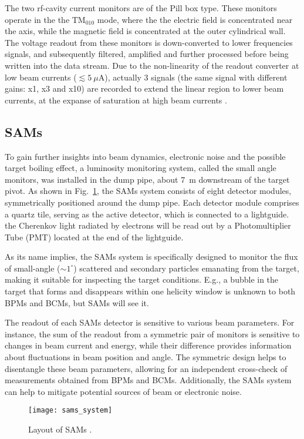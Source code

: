 The two rf-cavity current monitors are of the Pill box type. These monitors
operate in the the $\text{TM}_\text{010}$ mode, where the the electric field is
concentrated near the axis, while the magnetic field is concentrated at the outer
cylindrical wall. The voltage readout from these monitors is down-converted to 
lower frequencies signals, and subsequently filtered, amplified and further 
processed before being written into the data stream. Due to
the non-linearity of the readout converter at low beam currents ($\lesssim 5\ \mu$A), 
actually 3 signals (the same signal with different gains: x1, x3 and x10) are
recorded to extend the linear region to lower beam currents, at the expanse of saturation
at high beam currents \cite{halla_manual}.

\subsection{SAMs}
To gain further insights into beam dynamics, electronic noise and the possible target 
boiling effect, a luminosity monitoring system, called the small angle monitors, 
was installed in the dump pipe, about 7~m downstream of the target pivot. As shown
in Fig.~\ref{fig:sams}, the SAMs system consists of eight detector modules, symmetrically 
positioned around the dump pipe. Each detector module comprises a quartz tile,
serving as the active detector, which is connected to a lightguide. 
the Cherenkov light radiated by electrons	%
will be read out by a Photomultiplier Tube (PMT) located at the end of the lightguide. 

As its name implies, the SAMs system is specifically designed to monitor the flux
of small-angle ($\sim 1^\circ$) scattered and secondary particles emanating 
from the target, making it suitable for inspecting the target conditions. 
E.g., a bubble in the target that forms and disappears
within one helicity window is unknown to both BPMs and BCMs, but SAMs will see it.

The readout of each SAMs detector is sensitive to various beam parameters.
For instance, the sum of the readout from a symmetric pair of monitors is sensitive to changes
in beam current and energy, while their difference provides information about
fluctuations in beam position and angle.
The symmetric design helps to disentangle these beam parameters, allowing for
an independent cross-check of measurements obtained from BPMs and BCMs. 
Additionally, the SAMs system can help to mitigate potential sources of
beam or electronic noise.
\begin{figure}[!h]
    \centering
    \texttt{[image: sams\_system]}
    \caption{Layout of SAMs \cite{Devi2021}.}
    \label{fig:sams}
\end{figure}

